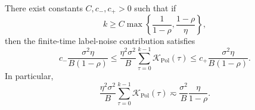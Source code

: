 \begin{lemma}
\label{lem:pol_label_noise}
There exist constants $C,c_-,c_+>0$ such that if
\begin{equation}
\label{eq:pol_label_noise_time_condition}
    k\ge
    C
    \max\left\{
        \frac{1}{1-\rho},
        \frac{1-\rho}{\eta}
    \right\},
\end{equation}
then the finite-time label-noise contribution satisfies
\begin{equation}
\label{eq:pol_label_noise_explicit_bounds}
    c_-\frac{\sigma^2\eta}{B(1-\rho)}
    \le
    \frac{\eta^2\sigma^2}{B}\sum_{\tau=0}^{k-1}\mathcal{K}_{\mathrm{Pol}}(\tau)
    \le
    c_+\frac{\sigma^2\eta}{B(1-\rho)}.
\end{equation}
In particular,
\[
    \frac{\eta^2\sigma^2}{B}\sum_{\tau=0}^{k-1}\mathcal{K}_{\mathrm{Pol}}(\tau)
    \eqsim
    \frac{\sigma^2}{B}\frac{\eta}{1-\rho}.
\]
\end{lemma}

